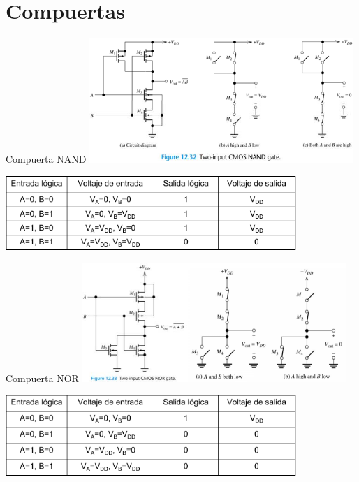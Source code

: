 \documentclass[aspectratio=169,t]{beamer}
\begin{document}
\section{Compuertas}
\begin{frame}{Compuerta NAND}
\centering
\includegraphics[width=10cm]{gate-NAND}

\includegraphics[width=11cm]{tabla-NAND}
\end{frame}


\begin{frame}{Compuerta NOR}
\centering
\includegraphics[width=10cm]{gate-NOR}

\includegraphics[width=11cm]{tabla-NOR}
\end{frame}
\end{document}
